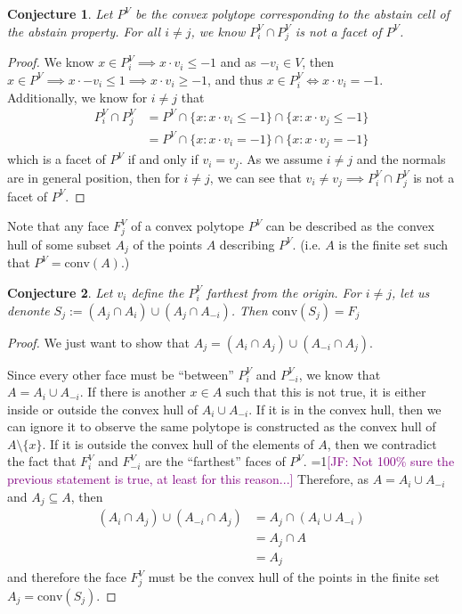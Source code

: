 \documentclass[12pt]{article}
\newcommand{\Comments}{1}
\newcommand{\mynote}[2]{\ifnum\Comments=1\textcolor{#1}{#2}\fi}
\newcommand{\jessie}[1]{\mynote{purple}{[JF: #1]}}
\newcommand{\conv}{\mathrm{conv}}
\newtheorem{conjecture}{Conjecture}
\begin{document}
\begin{conjecture}\label{conj:intersect-Pi-not-facet}
	Let $P^V$ be the convex polytope corresponding to the abstain cell of the abstain property.
	For all $i \neq j$, we know $P^V_i \cap P^V_j$ is not a facet of $P^V$.
\end{conjecture}
\begin{proof}
	We know $x \in P^V_i \implies x \cdot v_i \leq -1$ and as $-v_i \in V$, then $x \in P^V \implies x \cdot -v_i \leq 1 \implies x \cdot v_i \geq -1$, and thus $x \in P^V_i \iff x \cdot v_i = -1$.
	Additionally, we know for $i \neq j$ that 
	\begin{align*}
	P_i^V \cap P_j^V &= P^V \cap \{x : x \cdot v_i \leq -1 \} \cap \{x : x \cdot v_j \leq -1 \}\\
	&= P^V \cap \{x : x \cdot v_i = -1 \} \cap \{x : x \cdot v_j = -1 \}
	\end{align*} 
	which is a facet of $P^V$ if and only if $v_i = v_j$.
	As we assume $i \neq j$ and the normals are in general position, then for $i \neq j$, we can see that $v_i \neq v_j \implies P^V_i \cap P_j^V$ is not a facet of $P^V$.
\end{proof}



Note that any face $F_j^V$ of a convex polytope $P^V$ can be described as the convex hull of some subset $A_j$ of the points $A$ describing $P^V$.
(i.e. $A$ is the finite set such that $P^V = \conv(A)$.)
\begin{conjecture}\label{conj:convex-hull-subset-Fi}
	Let $v_i$ define the $P_i^V$ farthest from the origin.
	For $i \neq j$, let us denonte $S_j := (A_j \cap A_i) \cup (A_j \cap A_{-i})$.
	Then $\conv(S_j) = F_j$
\end{conjecture}
\begin{proof}
We just want to show that $A_j = (A_i \cap A_j) \cup (A_{-i} \cap A_j)$.

Since every other face must be ``between'' $P_i^V$ and $P_{-i}^V$, we know that $A = A_i \cup A_{-i}$.
If there is another $x \in A$ such that this is not true, it is either inside or outside the convex hull of $A_i \cup A_{-i}$.
If it is in the convex hull, then we can ignore it to observe the same polytope is constructed as the convex hull of $A \setminus \{x\}$.
If it is outside the convex hull of the elements of $A$, then we contradict the fact that $F_i^V$ and $F_{-i}^V$ are the ``farthest'' faces of $P^V$.
\jessie{Not 100\% sure the previous statement is true, at least for this reason...}
Therefore, as $A = A_i \cup A_{-i}$ and $A_j \subseteq A$, then 
\begin{align*}
(A_i \cap A_j) \cup (A_{-i} \cap A_j) &= A_j \cap (A_i \cup A_{-i})\\
&= A_j \cap A\\
&= A_j
\end{align*}
and therefore the face $F_j^V$ must be the convex hull of the points in the finite set $A_j = \conv(S_j)$.

\end{proof}
\end{document}

